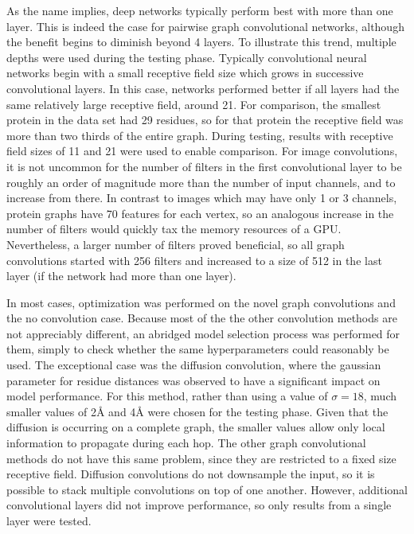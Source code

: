 As the name implies, deep networks typically perform best with more than one layer. 
This is indeed the case for pairwise graph convolutional networks, although the benefit begins to diminish beyond 4 layers.
To illustrate this trend, multiple depths were used during the testing phase.
Typically convolutional neural networks begin with a small receptive field size which grows in successive convolutional layers.
In this case, networks performed better if all layers had the same relatively large receptive field, around 21. 
For comparison, the smallest protein in the data set had 29 residues, so for that protein the receptive field was more than two thirds of the entire graph. 
During testing, results with receptive field sizes of 11 and 21 were used to enable comparison.
For image convolutions, it is not uncommon for the number of filters in the first convolutional layer to be roughly an order of magnitude more than the number of input channels, and to increase from there.
In contrast to images which may have only 1 or 3 channels, protein graphs have 70 features for each vertex, so an analogous increase in the number of filters would quickly tax the memory resources of a GPU. 
Nevertheless, a larger number of filters proved beneficial, so all graph convolutions started with 256 filters and increased to a size of 512 in the last layer (if the network had more than one layer).


In most cases, optimization was performed on the novel graph convolutions and the no convolution case.
Because most of the the other convolution methods are not appreciably different, an abridged model selection process was performed for them, simply to check whether the same hyperparameters could reasonably be used. 
The exceptional case was the diffusion convolution, where the gaussian parameter for residue distances was observed to have a significant impact on model performance. 
For this method, rather than using a value of $\sigma = 18$, much smaller values of 2\AA{} and 4\AA{} were chosen for the testing phase.
Given that the diffusion is occurring on a complete graph, the smaller values allow only local information to propagate during each hop.
The other graph convolutional methods do not have this same problem, since they are restricted to a fixed size receptive field. 
Diffusion convolutions do not downsample the input, so it is possible to stack multiple convolutions on top of one another.
However, additional convolutional layers did not improve performance, so only results from a single layer were tested.

